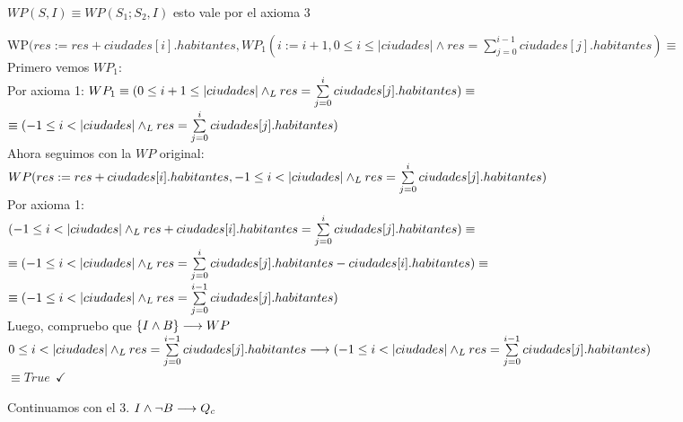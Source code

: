 \documentclass[10pt,a4paper]{article}
\begin{document}
$WP(S,I) \equiv WP(S_1; S_2, I)$ esto vale por el axioma 3 \\

\vspace{0.1cm}

WP$(res:= res + ciudades[i].habitantes, WP_1(i:=i+1, 0 \leq i \leq |ciudades| \land res = \sum\limits_{j=0}^{i-1} ciudades[j].habitantes ) \equiv$ \\

Primero vemos $WP_{1}$: \\

Por axioma 1: $WP_1 \equiv  (0 \leq i+1 \leq |ciudades| \land _L res = \sum\limits_{j=0}^{i} ciudades[j].habitantes) \equiv $ \\


$\equiv (-1 \leq i < |ciudades| \land _L res = \sum\limits_{j=0}^{i} ciudades[j].habitantes)$\\

Ahora seguimos con la $WP$ original: \\

$WP(res: = res + ciudades[i].habitantes, -1 \leq i < |ciudades| \land _L res = \sum\limits_{j=0}^{i} ciudades[j].habitantes)$ \\

Por axioma 1: \\

$(-1 \leq i < |ciudades| \land _L res + ciudades[i].habitantes = \sum\limits_{j=0}^{i} ciudades[j].habitantes) \equiv $ \\

$\equiv (-1 \leq i < |ciudades| \land _L res = \sum\limits_{j=0}^{i} ciudades[j].habitantes - ciudades[i].habitantes) \equiv $ \\

$\equiv (-1 \leq i < |ciudades| \land _L res = \sum\limits_{j=0}^{i-1} ciudades[j].habitantes)$ \\

Luego, compruebo que $\left\{I \wedge B\right\} \longrightarrow WP$\\

$0 \leq i < |ciudades| \land _L res = \sum\limits_{j=0}^{i-1} ciudades[j].habitantes \longrightarrow (-1 \leq i < |ciudades| \land _L res = \sum\limits_{j=0}^{i-1} ciudades[j].habitantes)$ \\

$\equiv True \ \ \checkmark$

\vspace{0.3cm}
Continuamos con el 3. $I \land \neg B \longrightarrow Q_c$ \\
\vspace{0.2cm}
\end{document}
